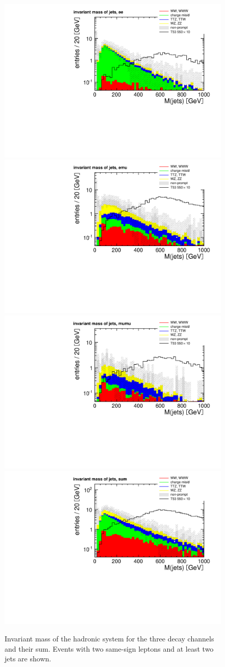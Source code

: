 \begin{figure}[htb]
    \centering
    \includegraphics[width=.7\textwidth]{images/pdf/had_mass_ee_0}
    \includegraphics[width=.7\textwidth]{images/pdf/had_mass_emu_0}
    \includegraphics[width=.7\textwidth]{images/pdf/had_mass_mumu_0}
    \includegraphics[width=.7\textwidth]{images/pdf/had_mass_sum_0}
    \caption{Invariant mass of the hadronic system for the three decay
    channels and their sum. Events with two same-sign leptons and at least
two jets are shown.}
    \label{fig:had_mass}
\end{figure}


